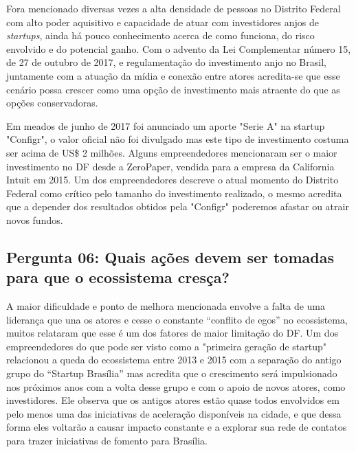 Fora mencionado diversas vezes a alta densidade de pessoas no Distrito Federal com alto poder aquisitivo e capacidade de atuar com investidores anjos de \textit{startups}, ainda há pouco conhecimento acerca de como funciona, do risco envolvido e do potencial ganho. Com o advento da Lei Complementar número 15, de 27 de outubro de 2017, e regulamentação do investimento anjo no Brasil, juntamente com a atuação da mídia e conexão entre atores acredita-se que esse cenário possa crescer como uma opção de investimento mais atraente do que as opções conservadoras.

Em meados de junho de 2017 foi anunciado um aporte "Serie A" na startup "Configr", o valor oficial não foi divulgado mas este tipo de investimento costuma ser acima de US\$ 2 milhões. Alguns empreendedores mencionaram ser o maior investimento no DF desde a ZeroPaper, vendida para a empresa da California Intuit em 2015. Um dos empreendedores descreve o atual momento do Distrito Federal como crítico pelo tamanho do investimento realizado, o mesmo acredita que a depender dos resultados obtidos pela "Configr" poderemos afastar ou atrair novos fundos.

\subsection*{Pergunta 06: Quais ações devem ser tomadas para que o ecossistema cresça?}
\label{subsection:pergunta_de_pesquisa_6}

A maior dificuldade e ponto de melhora mencionada envolve a falta de uma liderança que una os atores e cesse o constante ``conflito de egos'' no ecossistema, muitos relataram que esse é um dos fatores de maior limitação do DF. Um dos empreendedores do que pode ser visto como a "primeira geração de startup" relacionou a queda do ecossistema entre 2013 e 2015 com a separação do antigo grupo do ``Startup Brasília'' mas acredita que o crescimento será impulsionado nos próximos anos com a volta desse grupo e com o apoio de novos atores, como investidores. Ele observa que os antigos atores estão quase todos envolvidos em pelo menos uma das iniciativas de aceleração disponíveis na cidade, e que dessa forma eles voltarão a causar impacto constante e a explorar sua rede de contatos para trazer iniciativas de fomento para Brasília.  

